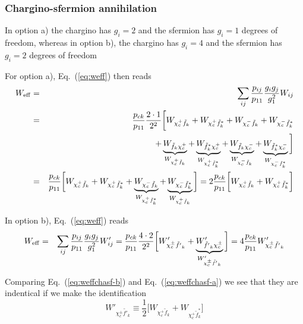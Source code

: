 \subsubsection{Chargino-sfermion annihilation}

In option a) the chargino has $g_i=2$ and the sfermion has $g_i=1$ degrees of freedom, whereas in option b), the chargino has $g_i=4$ and the sfermion has $g_i=2$ degrees of freedom

For option a), Eq.~(\ref{eq:weff}) then reads
\begin{eqnarray}
    W_{\rm eff} & = & \sum_{ij}\frac{p_{ij}}{p_{11}} 
    \frac{g_{i}g_{j}}{g_{1}^2} W_{ij} \nonumber \\
    & = &
    \frac{p_{ck}}{p_{11}} \frac{2 \cdot 1}{2^2}
    \bigg[ 
    W_{\chi_{c}^+ \tilde{f}_{k}} +
    W_{\chi_{c}^+ \tilde{f}_{k}^*} +
    W_{\chi_{c}^- \tilde{f}_{k}} +
    W_{\chi_{c}^- \tilde{f}_{k}^*} \nonumber \\
    & & +
    \underbrace{W_{\tilde{f}_{k} \chi_{c}^+}}_
      {W_{\chi_{c}^+ \tilde{f}_{k}}} +
    \underbrace{W_{\tilde{f}_{k}^* \chi_{c}^+}}_
      {W_{\chi_{c}^+ \tilde{f}_{k}^*}} +
    \underbrace{W_{\tilde{f}_{k} \chi_{c}^-}}_
      {W_{\chi_{c}^- \tilde{f}_{k}}} +
    \underbrace{W_{\tilde{f}_{k}^* \chi_{c}^-}}_
      {W_{\chi_{c}^- \tilde{f}_{k}^*}}
    \bigg] \nonumber \\
    & = &
    \frac{p_{ck}}{p_{11}}
    \bigg[ 
    W_{\chi_{c}^+ \tilde{f}_{k}} +
    W_{\chi_{c}^+ \tilde{f}_{k}^*} +
    \underbrace{W_{\chi_{c}^- \tilde{f}_{k}}}_
      {W_{\chi_{c}^+ \tilde{f}_{k}^*}} +
    \underbrace{W_{\chi_{c}^- \tilde{f}_{k}^*}}_
      {W_{\chi_{c}^+ \tilde{f}_{k}}}
    \bigg]
    = 
    2 \frac{p_{ck}}{p_{11}}
    \bigg[ 
    W_{\chi_{c}^+ \tilde{f}_{k}} +
    W_{\chi_{c}^+ \tilde{f}_{k}^*} \bigg]
    \label{eq:weffchasf-a}
\end{eqnarray}

In option b), Eq.~(\ref{eq:weff}) reads
\begin{eqnarray}
    W_{\rm eff} & = & \sum_{ij}\frac{p_{ij}}{p_{11}} 
    \frac{g_{i}g_{j}}{g_{1}^2} W'_{ij}
    =
    \frac{p_{ck}}{p_{11}} \frac{4 \cdot 2}{2^2}
    \bigg[ 
    W'_{\chi_{c}^\pm \tilde{f'}_{k}} +
    \underbrace{W'_{\tilde{f'}_{k} \chi_{c}^\pm}}_
      {W'_{\chi_{c}^\pm \tilde{f'}_{k}}} \bigg]
    = 4 \frac{p_{ck}}{p_{11}} W'_{\chi_{c}^\pm \tilde{f'}_{k}}
    \label{eq:weffchasf-b}
\end{eqnarray}

Comparing Eq.~(\ref{eq:weffchasf-b}) and Eq.~(\ref{eq:weffchasf-a}) we 
see that they are indentical if we make the identification
\begin{equation}
    W'_{\chi_{c}^\pm \tilde{f'}_{k}} \equiv
    \frac{1}{2} \bigg[ 
    W_{\chi_{c}^+ \tilde{f}_{k}} + 
    W_{\chi_{c}^+ \tilde{f}_{k}^*}
    \bigg] 
\end{equation}

